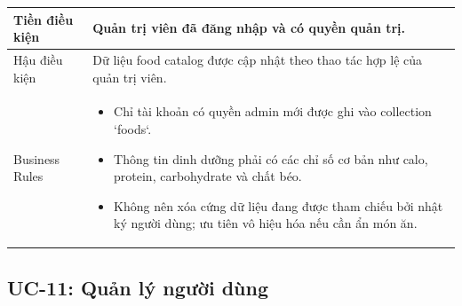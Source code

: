 \begin{longtable}{|p{4cm}|p{11cm}|}
    \hline
    Tiền điều kiện & Quản trị viên đã đăng nhập và có quyền quản trị. \\
    \hline
    Hậu điều kiện & Dữ liệu food catalog được cập nhật theo thao tác hợp lệ của quản trị viên. \\
    \hline
    Business Rules &
        \begin{itemize}[nosep]
            \item Chỉ tài khoản có quyền admin mới được ghi vào collection `foods`.
            \item Thông tin dinh dưỡng phải có các chỉ số cơ bản như calo, protein, carbohydrate và chất béo.
            \item Không nên xóa cứng dữ liệu đang được tham chiếu bởi nhật ký người dùng; ưu tiên vô hiệu hóa nếu cần ẩn món ăn.
        \end{itemize} \\
    \hline
\end{longtable}


\subsection{UC-11: Quản lý người dùng}

